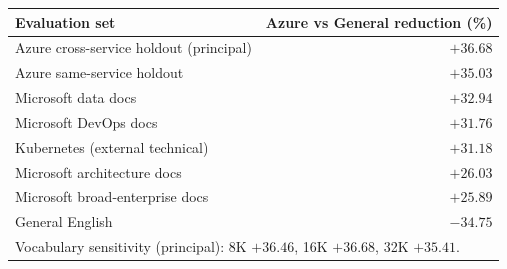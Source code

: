 \begin{tabular}{lr}
\toprule
\textbf{Evaluation set} & \textbf{Azure vs General reduction (\%)} \\
\midrule
Azure cross-service holdout (principal) & $+36.68$ \\
Azure same-service holdout & $+35.03$ \\
Microsoft data docs & $+32.94$ \\
Microsoft DevOps docs & $+31.76$ \\
Kubernetes (external technical) & $+31.18$ \\
Microsoft architecture docs & $+26.03$ \\
Microsoft broad-enterprise docs & $+25.89$ \\
General English & $-34.75$ \\
\midrule
\multicolumn{2}{l}{\footnotesize Vocabulary sensitivity (principal): 8K $+36.46$, 16K $+36.68$, 32K $+35.41$.} \\
\bottomrule
\end{tabular}
